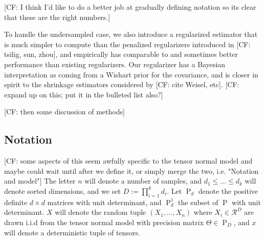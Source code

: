 \documentclass{article}
\newcommand{\R}{{\mathbb{R}}}
\newcommand\PD{\operatorname{P}}
\newcommand\samp{x}
\newcommand\rv{X}
\newcommand\RR{\mathcal{R}}
\newcommand{\CF}[1]{{\color{purple}[CF: #1]}}
\begin{document}
\CF{I think I'd like to do a better job at gradually defining notation so its clear that these are the right numbers.}

To handle the undersampled case, we also introduce a regularized estimator that is much simpler to compute than the penalized regularizers introduced in \CF{tsilig, sun, zhou}, and empirically has comparable to and sometimes better performance than existing regularizers. Our regularizer has a Bayesian interpretation as coming from a Wishart prior for the covariance, and is closer in spirit to the shrinkage estimators considered by \CF{cite Weisel, etc}. \CF{expand up on this; put it in the bulleted list also?}














\CF{then some discussion of methods}

\subsection{Notation}
\CF{some aspects of this seem awfully specific to the tensor normal model and maybe could wait until after we define it, or simply merge the two, i.e. "Notation and model"}
The letter $n$ will denote a number of samples, and $d_1\leq \dots \leq d_k$ will denote sorted dimensions, and we set $D:=\prod_{i = 1}^k d_i$. Let $\PD_d$ denote the positive definite $d\times d$ matrices with unit determinant, and $\PD_d^1$ the subset of $\PD$ with unit determinant. $\rv$ will denote the random tuple $(\rv_1, \dots, \rv_n)$ where $\rv_i \in \RR^{D}$ are drawn i.i.d from the tensor normal model with precision matrix $\Theta \in \PD_D$, and $\samp$ will denote a deterministic tuple of tensors. 
\end{document}
